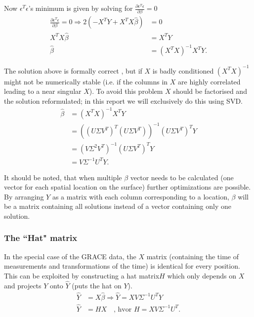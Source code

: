 Now  $\epsilon^T \epsilon$'s minimum is given by solving for $\frac{\partial \epsilon^T\epsilon}{\partial \beta} = 0$
\begin{equation}
\begin{split}
\frac{\partial \epsilon^T\epsilon}{\partial \beta} = 0 \Rightarrow 2(-X^T Y+X^T X \hat{\beta}) &= 0 \\
X^T X \hat{\beta}&=X^T Y \\
\hat{\beta}&=(X^T X)^{-1} X^T Y.
\end{split}
\end{equation}

The solution above is formally correct \cite[s.~12]{statistical-learning}, but if $X$ is badly conditioned $(X^T X)^{-1}$ might not be numerically stable (i.e. if the columns in $X$ are highly correlated leading to a near singular $X$).
To avoid this problem $X$ should be factorised and the solution reformulated; in this report we will exclusively do this using SVD.
\begin{equation}
\begin{split}
\hat{\beta} &= (X^T X)^{-1} X^T Y \\
&= \left( \left(U \Sigma V^T\right)^T \left(U \Sigma V^T\right) \right)^{-1} \left(U \Sigma V^T \right)^T Y \\
&= \left( V \Sigma^2 V^T \right)^{-1} \left(U \Sigma V^T \right)^T Y \\
&= V \Sigma^{-1} U^T Y.
\end{split}
\end{equation}

It should be noted, that when multiple $\beta$ vector needs to be calculated (one vector for each spatial location on the surface) further optimizations are possible.
By arranging $Y$ as a matrix with each column corresponding to a location, $\beta$ will be a matrix containing all solutions instead of a vector containing only one solution.

\subsubsection{The ``Hat" matrix}
In the special case of the GRACE data, the $X$ matrix (containing the time of measurements and transformations of the time) is identical for every position. This can be exploited by constructing a hat matrix$H$ which only depends on $X$ and projects $Y$ onto $\hat{Y}$ (puts the hat on $Y$).
\begin{equation}
\begin{split}
\hat{Y} &= X \hat{\beta} \Rightarrow \hat{Y} = X V \Sigma^{-1} U^T Y \\
\hat{Y} &= H X \quad \text{, hvor } H = X V \Sigma^{-1} U^T.
\end{split}
\end{equation}

